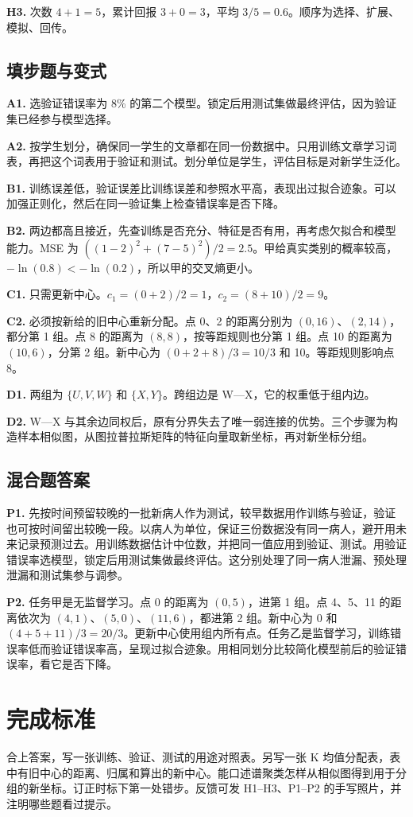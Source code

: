 \documentclass[UTF8,a4paper,11pt]{ctexart}
\begin{document}
\textbf{H3.} 次数 $4+1=5$，累计回报 $3+0=3$，平均 $3/5=0.6$。顺序为选择、扩展、模拟、回传。

\subsection{填步题与变式}
\textbf{A1.} 选验证错误率为 8\% 的第二个模型。锁定后用测试集做最终评估，因为验证集已经参与模型选择。

\textbf{A2.} 按学生划分，确保同一学生的文章都在同一份数据中。只用训练文章学习词表，再把这个词表用于验证和测试。划分单位是学生，评估目标是对新学生泛化。

\textbf{B1.} 训练误差低，验证误差比训练误差和参照水平高，表现出过拟合迹象。可以加强正则化，然后在同一验证集上检查错误率是否下降。

\textbf{B2.} 两边都高且接近，先查训练是否充分、特征是否有用，再考虑欠拟合和模型能力。MSE 为 $((1-2)^2+(7-5)^2)/2=2.5$。甲给真实类别的概率较高，$-\ln(0.8)<-\ln(0.2)$，所以甲的交叉熵更小。

\textbf{C1.} 只需更新中心。$c_1=(0+2)/2=1$，$c_2=(8+10)/2=9$。

\textbf{C2.} 必须按新给的旧中心重新分配。点 0、2 的距离分别为 $(0,16)$、$(2,14)$，都分第 1 组。点 8 的距离为 $(8,8)$，按等距规则也分第 1 组。点 10 的距离为 $(10,6)$，分第 2 组。新中心为 $(0+2+8)/3=10/3$ 和 10。等距规则影响点 8。

\textbf{D1.} 两组为 $\{U,V,W\}$ 和 $\{X,Y\}$。跨组边是 W—X，它的权重低于组内边。

\textbf{D2.} W—X 与其余边同权后，原有分界失去了唯一弱连接的优势。三个步骤为构造样本相似图，从图拉普拉斯矩阵的特征向量取新坐标，再对新坐标分组。

\clearpage
\subsection{混合题答案}
\textbf{P1.} 先按时间预留较晚的一批新病人作为测试，较早数据用作训练与验证，验证也可按时间留出较晚一段。以病人为单位，保证三份数据没有同一病人，避开用未来记录预测过去。用训练数据估计中位数，并把同一值应用到验证、测试。用验证错误率选模型，锁定后用测试集做最终评估。这分别处理了同一病人泄漏、预处理泄漏和测试集参与调参。

\textbf{P2.} 任务甲是无监督学习。点 0 的距离为 $(0,5)$，进第 1 组。点 4、5、11 的距离依次为 $(4,1)$、$(5,0)$、$(11,6)$，都进第 2 组。新中心为 0 和 $(4+5+11)/3=20/3$。更新中心使用组内所有点。任务乙是监督学习，训练错误率低而验证错误率高，呈现过拟合迹象。用相同划分比较简化模型前后的验证错误率，看它是否下降。

\section{完成标准}
合上答案，写一张训练、验证、测试的用途对照表。另写一张 K 均值分配表，表中有旧中心的距离、归属和算出的新中心。能口述谱聚类怎样从相似图得到用于分组的新坐标。订正时标下第一处错步。反馈可发 H1–H3、P1–P2 的手写照片，并注明哪些题看过提示。
\end{document}
